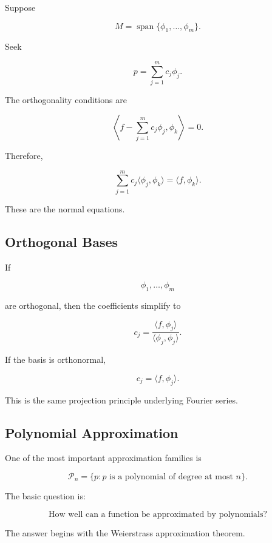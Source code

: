 Suppose

\[
M
=
\operatorname{span}
\{
\phi_1,\ldots,\phi_m
\}.
\]

Seek

\[
p
=
\sum_{j=1}^{m}
c_j\phi_j.
\]

The orthogonality conditions are

\[
\left\langle
f-
\sum_{j=1}^{m}c_j\phi_j,
\phi_k
\right\rangle
=
0.
\]

Therefore,

\[
\boxed{
\sum_{j=1}^{m}
c_j
\langle\phi_j,\phi_k\rangle
=
\langle f,\phi_k\rangle.
}
\]

These are the normal equations.

\subsection{Orthogonal Bases}
\label{subsec:approximation-orthogonal-bases}

If

\[
\phi_1,\ldots,\phi_m
\]

are orthogonal, then the coefficients simplify to

\[
\boxed{
c_j
=
\frac{\langle f,\phi_j\rangle}
{\langle\phi_j,\phi_j\rangle}.
}
\]

If the basis is orthonormal,

\[
\boxed{
c_j
=
\langle f,\phi_j\rangle.
}
\]

This is the same projection principle underlying Fourier series.

\subsection{Polynomial Approximation}
\label{subsec:polynomial-approximation}

One of the most important approximation families is

\[
\boxed{
\mathcal{P}_n
=
\{
p:
p\text{ is a polynomial of degree at most }n
\}.
}
\]

The basic question is:

\[
\boxed{
\text{How well can a function be approximated by polynomials?}
}
\]

The answer begins with the Weierstrass approximation theorem.

